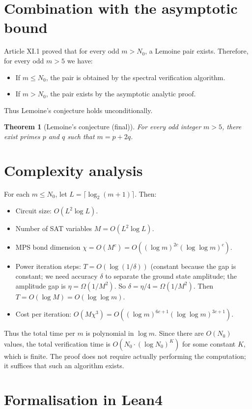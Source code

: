 \documentclass[11pt,a4paper]{article}
\newtheorem{theorem}{Theorem}[section]
\begin{document}
\section{Combination with the asymptotic bound}

Article XI.1 proved that for every odd \(m > N_0\), a Lemoine pair exists. Therefore, for every odd \(m > 5\) we have:
\begin{itemize}
\item If \(m \le N_0\), the pair is obtained by the spectral verification algorithm.
\item If \(m > N_0\), the pair exists by the asymptotic analytic proof.
\end{itemize}
Thus Lemoine's conjecture holds unconditionally.

\begin{theorem}[Lemoine's conjecture (final)]\label{thm:lemoine}
For every odd integer \(m > 5\), there exist primes \(p\) and \(q\) such that \(m = p + 2q\).
\end{theorem}

\section{Complexity analysis}

For each \(m \le N_0\), let \(L = \lceil \log_2(m+1)\rceil\). Then:
\begin{itemize}
\item Circuit size: \(O(L^2 \log L)\).
\item Number of SAT variables \(M = O(L^2 \log L)\).
\item MPS bond dimension \(\chi = O(M^c) = O((\log m)^{2c} (\log \log m)^c)\).
\item Power iteration steps: \(T = O(\log(1/\delta))\) (constant because the gap is constant; we need accuracy \(\delta\) to separate the ground state amplitude; the amplitude gap is \(\eta = \Omega(1/M^2)\). So \(\delta = \eta/4 = \Omega(1/M^2)\). Then \(T = O(\log M) = O(\log \log m)\).
\item Cost per iteration: \(O(M\chi^3) = O((\log m)^{6c+1} (\log \log m)^{3c+1})\).
\end{itemize}
Thus the total time per \(m\) is polynomial in \(\log m\). Since there are \(O(N_0)\) values, the total verification time is \(O(N_0 \cdot (\log N_0)^K)\) for some constant \(K\), which is finite. The proof does not require actually performing the computation; it suffices that such an algorithm exists.

\section{Formalisation in Lean4}
\end{document}

